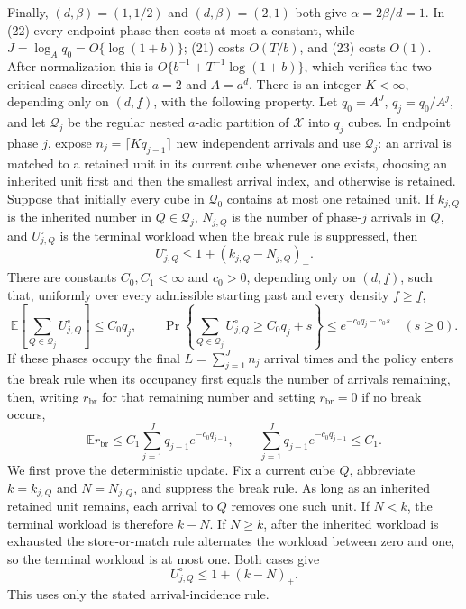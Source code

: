Finally, \((d,\beta)=(1,1/2)\) and \((d,\beta)=(2,1)\) both give \(\alpha=2\beta/d=1\).  In (22) every endpoint phase then costs at most a constant, while \(J=\log_Aq_0=O\{\log(1+b)\}\); (21) costs \(O(T/b)\), and (23) costs \(O(1)\).  After normalization this is \(O\{b^{-1}+T^{-1}\log(1+b)\}\), which verifies the two critical cases directly.
Let \(a=2\) and \(A=a^d\).  There is an integer \(K<\infty\), depending only on \((d,\underline f)\), with the following property.  Let \(q_0=A^J\), \(q_j=q_0/A^j\), and let \(\mathcal Q_j\) be the regular nested \(a\)-adic partition of \(\mathcal X\) into \(q_j\) cubes.  In endpoint phase \(j\), expose \(n_j=\lceil Kq_{j-1}\rceil\) new independent arrivals and use \(\mathcal Q_j\): an arrival is matched to a retained unit in its current cube whenever one exists, choosing an inherited unit first and then the smallest arrival index, and otherwise is retained.  Suppose that initially every cube in \(\mathcal Q_0\) contains at most one retained unit.  If \(k_{j,Q}\) is the inherited number in \(Q\in\mathcal Q_j\), \(N_{j,Q}\) is the number of phase-\(j\) arrivals in \(Q\), and \(U^\circ_{j,Q}\) is the terminal workload when the break rule is suppressed, then
\[
 U^\circ_{j,Q}\le 1+(k_{j,Q}-N_{j,Q})_+ .
\]
There are constants \(C_0,C_1<\infty\) and \(c_0>0\), depending only on \((d,\underline f)\), such that, uniformly over every admissible starting past and every density \(f\ge\underline f\),
\[
 \mathbb E\!\left[\sum_{Q\in\mathcal Q_j}U^\circ_{j,Q}\right]\le C_0q_j,
 \qquad
 \Pr\!\left\{\sum_{Q\in\mathcal Q_j}U^\circ_{j,Q}\ge C_0q_j+s\right\}
 \le e^{-c_0q_j-c_0s}\quad(s\ge0).
\]
If these phases occupy the final \(L=\sum_{j=1}^Jn_j\) arrival times and the policy enters the break rule when its occupancy first equals the number of arrivals remaining, then, writing \(r_{\mathrm{br}}\) for that remaining number and setting \(r_{\mathrm{br}}=0\) if no break occurs,
\[
 \mathbb E r_{\mathrm{br}}
 \le C_1\sum_{j=1}^J q_{j-1}e^{-c_0q_{j-1}},
 \qquad
 \sum_{j=1}^J q_{j-1}e^{-c_0q_{j-1}}\le C_1.
\]
We first prove the deterministic update.  Fix a current cube \(Q\), abbreviate \(k=k_{j,Q}\) and \(N=N_{j,Q}\), and suppress the break rule.  As long as an inherited retained unit remains, each arrival to \(Q\) removes one such unit.  If \(N<k\), the terminal workload is therefore \(k-N\).  If \(N\ge k\), after the inherited workload is exhausted the store-or-match rule alternates the workload between zero and one, so the terminal workload is at most one.  Both cases give
\[
 U^\circ_{j,Q}\le 1+(k-N)_+ . \tag{1}
\]
This uses only the stated arrival-incidence rule.

